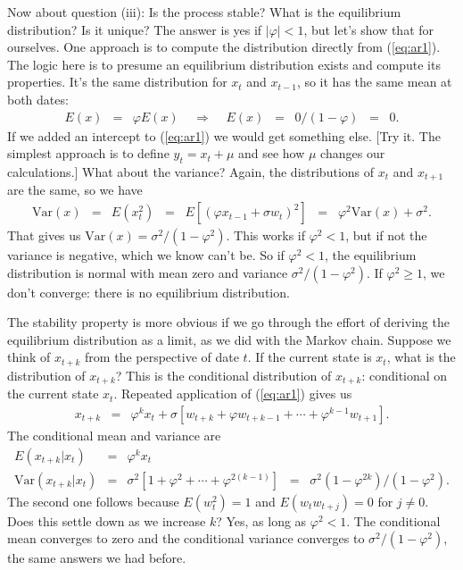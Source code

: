 \documentclass[11pt]{article}
\begin{document}
Now about question (iii):  Is the process stable?
What is the equilibrium distribution?
Is it unique?
The answer is yes if $|\varphi| < 1$, but let's show that for ourselves.
One approach is to compute the distribution directly
from (\ref{eq:ar1}).
The logic here is to presume an equilibrium distribution exists and
compute its properties.
It's the same distribution for $x_t$ and $x_{t-1}$,
so it has the same mean at both dates:
\begin{eqnarray*}
    E( x ) &=& \varphi E(x) \;\;\;\;\Rightarrow\;\;\;\; E(x)
        \;\;=\;\; 0/(1-\varphi) \;\;=\;\; 0 .
\end{eqnarray*}
If we added an intercept to (\ref{eq:ar1}) we would get something else.
[Try it. The simplest approach is to define $y_t = x_t + \mu$
and see how $\mu$ changes our calculations.]
What about the variance?
Again, the distributions of $x_t$ and $x_{t+1}$ are the same,
so we have
\begin{eqnarray*}
    \mbox{Var}(x) &=& E (x_{t}^2)
            \;\;=\;\; E \left[ (\varphi x_{t-1} + \sigma w_{t})^2 \right]
            \;\;=\;\; \varphi^2 \mbox{Var}(x) + \sigma^2.
\end{eqnarray*}
That gives us $\mbox{Var}(x) = \sigma^2 /(1-\varphi^2)$.
This works if $\varphi^2 < 1$,
but if not the variance is negative, which
we know can't be.  So if $ \varphi^2<1$, the
equilibrium distribution is normal with mean zero
and variance $ \sigma^2/(1-\varphi^2)$.
If $\varphi^2 \geq 1$, we don't converge:  there is no equilibrium distribution.

The stability property is more obvious if we go through the effort
of deriving the equilibrium distribution as a limit, as we did with the Markov chain.
Suppose we think of $x_{t+k}$ from the perspective of date $t$.
If the current state is $x_{t}$, what is the distribution of $x_{t+k}$?
This is the conditional distribution of $x_{t+k}$:  conditional
on the current state $x_t$.
Repeated application of (\ref{eq:ar1}) gives us
\begin{eqnarray*}
    x_{t+k} &=& \varphi^k x_{t} +
            \sigma \left[ w_{t+k} + \varphi w_{t+k-1} +
                    \cdots + \varphi^{k-1} w_{t+1} \right].
\end{eqnarray*}
The conditional mean and variance are
\begin{eqnarray*}
    E (x_{t+k} | x_t ) &=& \varphi^k x_{t} \\
    \mbox{Var}(x_{t+k} | x_t )
            &=&  \sigma^2 \left[ 1 + \varphi^2 + \cdots + \varphi^{2(k-1)} \right]
                \;\;=\;\; \sigma ^2 (1-\varphi^{2k})/(1-\varphi^2) .
\end{eqnarray*}
The second one follows because $E(w_t^2) = 1$
and $E (w_t w_{t+j}) = 0$ for $ j\neq 0$.
Does this settle down as we increase $k$?
Yes, as long as $\varphi^2 < 1$.
The conditional mean converges to zero and
the conditional variance converges to $\sigma^2/(1-\varphi^2)$,
the same answers we had before.
\end{document}
